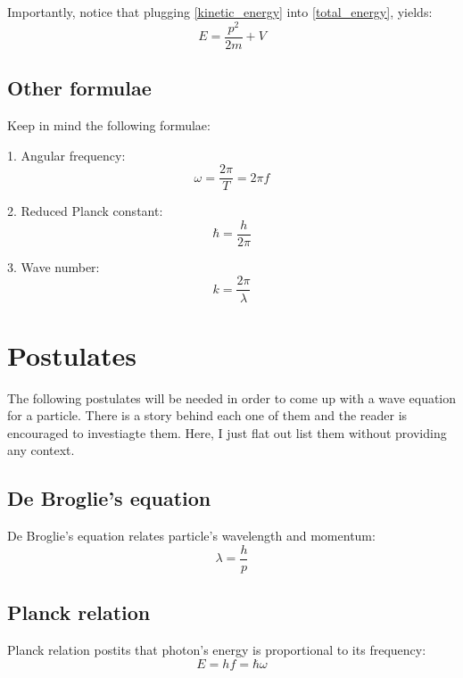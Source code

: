 \documentclass[12pt]{article}
\begin{document}
Importantly, notice that plugging \eqref{kinetic_energy} into \eqref{total_energy}, yields:
\begin{equation}\label{total_energy_qm}
E = \frac{p^2}{2m} + V
\end{equation}

\subsection{Other formulae}
Keep in mind the following formulae:
\item[1. ] Angular frequency:
\begin{equation}
\omega = \frac{2 \pi}{T} = 2 \pi f
\end{equation}
\item[2. ] Reduced Planck constant:
\begin{equation}
\hbar = \frac{h}{2\pi}
\end{equation}
\item[3. ] Wave number:
\begin{equation}
k = \frac{2\pi}{\lambda}
\end{equation}


\section{Postulates}
\label{postulates}
The following postulates will be needed in order to come up with a wave equation for a particle. There is a story behind each one of them and the reader is encouraged to investiagte them. Here, I just flat out list them without providing any context.

\subsection{De Broglie's equation}
De Broglie's equation relates particle's wavelength and momentum:
\begin{equation}\label{debroglie_equation}
\lambda = \frac{h}{p}
\end{equation}

\subsection{Planck relation}
Planck relation postits that photon's energy is proportional to its frequency:
\begin{equation}\label{planck_relation}
E = hf = \hbar \omega
\end{equation}
\end{document}
